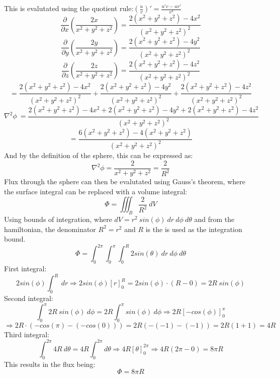 This is evalutated using the quotient rule:$(\frac{u}{v})' = \frac{u'v - uv'}{v^2}$
\[\frac{\partial}{\partial x}\left( \frac{2x}{x^2+y^2+z^2} \right) = \frac{2(x^2+y^2+z^2) - 4x^2}{(x^2+y^2+z^2)^2}\]
\[\frac{\partial}{\partial y}\left( \frac{2y}{x^2+y^2+z^2} \right) = \frac{2(x^2+y^2+z^2) - 4y^2}{(x^2+y^2+z^2)^2}\]
\[\frac{\partial}{\partial z}\left( \frac{2z}{x^2+y^2+z^2} \right) = \frac{2(x^2+y^2+z^2) - 4z^2}{(x^2+y^2+z^2)^2}\]
\[= \frac{2(x^2+y^2+z^2) - 4x^2}{(x^2+y^2+z^2)^2} + \frac{2(x^2+y^2+z^2) - 4y^2}{(x^2+y^2+z^2)^2} + \frac{2(x^2+y^2+z^2) - 4z^2}{(x^2+y^2+z^2)^2}\]
\[\nabla^2\phi\ = \frac{2(x^2+y^2+z^2) - 4x^2 + 2(x^2+y^2+z^2) -4y^2 + 2(x^2+y^2+z^2) - 4z^2}{(x^2+y^2+z^2)^2}\]
\[= \frac{6(x^2+y^2+z^2) - 4(x^2+y^2+z^2)}{(x^2+y^2+z^2)^2}\]
And by the definition of the sphere, this can be expressed as:
\[\nabla^2\phi =  \frac{2}{x^2+y^2+z^2} = \frac{2}{R^2}\]
Flux through the sphere can then be evalutated using Gauss's theorem, where the surface integral can be replaced with a volume integral:
\[\Phi = \iiint_{B} \frac{2}{R^2} \ dV\]
Using bounds of integration, where $dV = r^2 \ sin(\phi) \ dr \ d\phi \ d\theta$ and from the hamiltonian, the denominator $ R^2 = r^2$ and $R$ is the
is used as the integration bound.
\[\Phi = \int_{0}^{2\pi}\int_{0}^{\pi}\int_{0}^{R} 2sin(\theta) \ dr \ d\phi \  d\theta\]
First integral:
\[2sin(\phi) \int_{0}^{R} \ dr \Rightarrow 2sin(\phi) \left[r\right]^{R}_0 = 2sin(\phi)\cdot(R - 0) = 2R \ sin(\phi)\]
Second integral:
\[\int_{0}^{\pi}2R \ sin(\phi) \ d\phi = 2R \int_{0}^{\pi} sin(\phi) \ d\phi \Rightarrow 2R \left[-cos(\phi)\right]_0^\pi \]
\[\Rightarrow 2R\cdot(-cos(\pi)-(-cos(0))) = 2R(-(-1)-(-1)) = 2R(1+1) = 4R\]
Third integral:
\[\int_{0}^{2\pi}4R \ d\theta = 4R \int_{0}^{2\pi} d\theta \Rightarrow 4R \left[\theta\right]_0^{2\pi} \Rightarrow 4R(2\pi - 0) = 8\pi R\]
This results in the flux being:
\[\Phi = 8\pi R\]